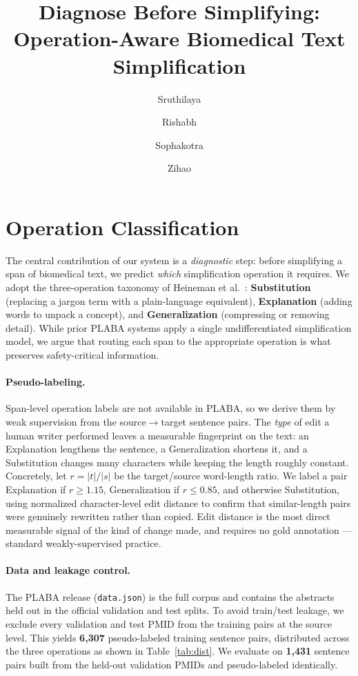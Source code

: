 \documentclass[11pt]{article}
\title{Diagnose Before Simplifying:\\ Operation-Aware Biomedical Text Simplification}
\author{Sruthilaya \and Rishabh \and Sophakotra \and Zihao}
\date{}
\begin{document}
\maketitle

\section{Operation Classification}

The central contribution of our system is a \emph{diagnostic} step: before
simplifying a span of biomedical text, we predict \emph{which} simplification
operation it requires. We adopt the three-operation taxonomy of
Heineman et al.~\cite{salsa}: \textbf{Substitution} (replacing a jargon term
with a plain-language equivalent), \textbf{Explanation} (adding words to unpack
a concept), and \textbf{Generalization} (compressing or removing detail). While
prior PLABA systems apply a single undifferentiated simplification model, we
argue that routing each span to the appropriate operation is what preserves
safety-critical information.

\paragraph{Pseudo-labeling.}
Span-level operation labels are not available in PLABA, so we derive them by
weak supervision from the source$\rightarrow$target sentence pairs. The
\emph{type} of edit a human writer performed leaves a measurable fingerprint on
the text: an Explanation lengthens the sentence, a Generalization shortens it,
and a Substitution changes many characters while keeping the length roughly
constant. Concretely, let $r = |t| / |s|$ be the target/source word-length
ratio. We label a pair Explanation if $r \ge 1.15$, Generalization if
$r \le 0.85$, and otherwise Substitution, using normalized character-level edit
distance to confirm that similar-length pairs were genuinely rewritten rather
than copied. Edit distance is the most direct measurable signal of the kind of
change made, and requires no gold annotation --- standard weakly-supervised
practice.

\paragraph{Data and leakage control.}
The PLABA release (\texttt{data.json}) is the full corpus and contains the
abstracts held out in the official validation and test splits. To avoid
train/test leakage, we exclude every validation and test PMID from the training
pairs at the source level. This yields \textbf{6{,}307} pseudo-labeled training
sentence pairs, distributed across the three operations as shown in
Table~\ref{tab:dist}. We evaluate on \textbf{1{,}431} sentence pairs built from
the held-out validation PMIDs and pseudo-labeled identically.
\end{document}
